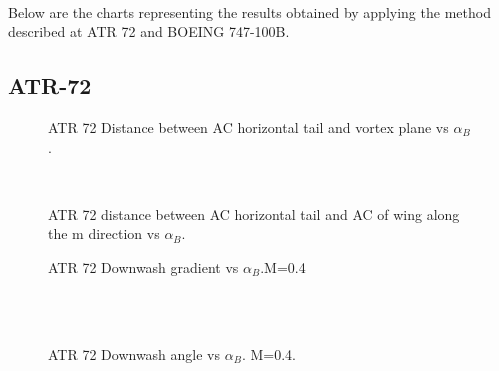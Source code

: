 %
%
%
%
%
%	                     
\noindent\\
Below are the charts representing the results obtained by applying the method described at ATR 72 and BOEING 747-100B.

\subsection{ATR-72}

\begin{figure}[H]
\centering

\caption{ATR 72 Distance between AC horizontal tail and vortex plane vs $\alpha_{B}$.}
\label{fig:zATR}
\end{figure}
\noindent \\
\begin{figure}[H]
\centering

\caption{ATR 72 distance between AC horizontal tail and AC of wing along the m direction vs $\alpha_{B}$.}
\label{fig:mATR}
\end{figure}


\begin{figure}[H]
\centering

\caption{ATR 72 Downwash gradient vs $\alpha_{B}$.M=0.4}
\label{fig:downwashgradATR}
\end{figure}
\noindent \\\\
\begin{figure}[H]
\centering

\caption{ATR 72 Downwash angle vs $\alpha_{B}$. M=0.4.}
\label{fig:epsilon}
\end{figure}





